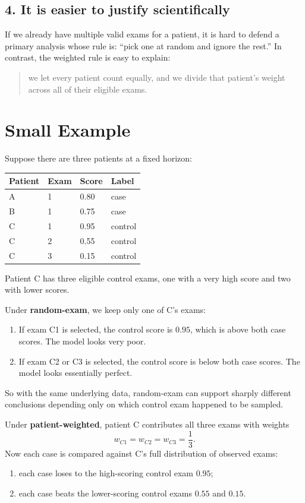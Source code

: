 \documentclass[11pt]{article}
\begin{document}
\subsection*{4. It is easier to justify scientifically}
If we already have multiple valid exams for a patient, it is hard to defend a primary analysis whose rule is: ``pick one at random and ignore the rest.'' In contrast, the weighted rule is easy to explain:
\begin{quote}
we let every patient count equally, and we divide that patient's weight across all of their eligible exams.
\end{quote}

\section*{Small Example}
Suppose there are three patients at a fixed horizon:
\begin{center}
\begin{tabular}{llll}
\toprule
Patient & Exam & Score & Label \\
\midrule
A & 1 & 0.80 & case \\
B & 1 & 0.75 & case \\
C & 1 & 0.95 & control \\
C & 2 & 0.55 & control \\
C & 3 & 0.15 & control \\
\bottomrule
\end{tabular}
\end{center}

Patient C has three eligible control exams, one with a very high score and two with lower scores.

Under \textbf{random-exam}, we keep only one of C's exams:
\begin{enumerate}[leftmargin=2em]
\item If exam C1 is selected, the control score is $0.95$, which is above both case scores. The model looks very poor.
\item If exam C2 or C3 is selected, the control score is below both case scores. The model looks essentially perfect.
\end{enumerate}

So with the same underlying data, random-exam can support sharply different conclusions depending only on which control exam happened to be sampled.

Under \textbf{patient-weighted}, patient C contributes all three exams with weights
\[
w_{C1}=w_{C2}=w_{C3}=\frac{1}{3}.
\]
Now each case is compared against C's full distribution of observed exams:
\begin{enumerate}[leftmargin=2em]
\item each case loses to the high-scoring control exam $0.95$;
\item each case beats the lower-scoring control exams $0.55$ and $0.15$.
\end{enumerate}
\end{document}
